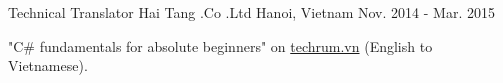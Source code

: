 

\begin{cventries}

  \cventry
    {Technical Translator} %
    {Hai Tang .Co .Ltd} %
    {Hanoi, Vietnam} %
    {Nov. 2014 - Mar. 2015} %
    {
      \begin{cvitems} %
        \item {"C\# fundamentals for absolute beginners" on \href{https://techrum.vn}{techrum.vn} (English to Vietnamese).}
      \end{cvitems}
    }

\end{cventries}

